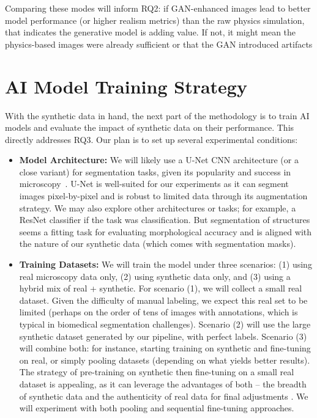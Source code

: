 \documentclass[
oneside,      %
openany       %
]{imc-inf}
\begin{document}
	Comparing these modes will inform RQ2: if GAN-enhanced images lead to better model performance (or higher realism metrics) than the raw physics simulation, that indicates the generative model is adding value. If not, it might mean the physics-based images were already sufficient or that the GAN introduced artifacts
	
	\section{AI Model Training Strategy}
	With the synthetic data in hand, the next part of the methodology is to train AI models and evaluate the impact of synthetic data on their performance. This directly addresses RQ3. Our plan is to set up several experimental conditions:
	
	
	\begin{itemize} %
		
		\item \textbf{Model Architecture:} We will likely use a U-Net CNN architecture (or a close variant) for segmentation tasks, given its popularity and success in microscopy~\cite{ronneberger2015unet}. U-Net is well-suited for our experiments as it can segment images pixel-by-pixel and is robust to limited data through its augmentation strategy. We may also explore other architectures or tasks; for example, a ResNet classifier if the task was classification. But segmentation of structures seems a fitting task for evaluating morphological accuracy and is aligned with the nature of our synthetic data (which comes with segmentation masks).
		
		\item \textbf{Training Datasets:} We will train the model under three scenarios: (1) using real microscopy data only, (2) using synthetic data only, and (3) using a hybrid mix of real + synthetic. For scenario (1), we will collect a small real dataset. Given the difficulty of manual labeling, we expect this real set to be limited (perhaps on the order of tens of images with annotations, which is typical in biomedical segmentation challenges). Scenario (2) will use the large synthetic dataset generated by our pipeline, with perfect labels. Scenario (3) will combine both: for instance, starting training on synthetic and fine-tuning on real, or simply pooling datasets (depending on what yields better results). The strategy of pre-training on synthetic then fine-tuning on a small real dataset is appealing, as it can leverage the advantages of both – the breadth of synthetic data and the authenticity of real data for final adjustments \cite{zhang2023synthetic}. We will experiment with both pooling and sequential fine-tuning approaches.
		

\end{itemize}
\end{document}
